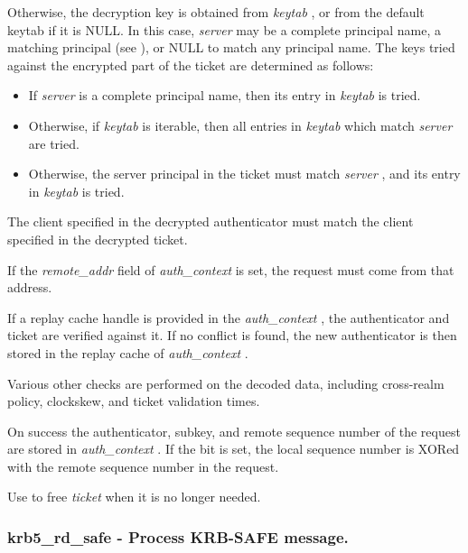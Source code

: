 \documentclass[letterpaper,10pt,english]{sphinxmanual}
\begin{document}
Otherwise, the decryption key is obtained from \emph{keytab} , or from the default keytab if it is NULL. In this case, \emph{server} may be a complete principal name, a matching principal (see {\hyperref[appdev/refs/api/krb5_sname_match:krb5_sname_match]{}} ), or NULL to match any principal name. The keys tried against the encrypted part of the ticket are determined as follows:
\begin{itemize}
\item {} 
If \emph{server} is a complete principal name, then its entry in \emph{keytab} is tried.

\item {} 
Otherwise, if \emph{keytab} is iterable, then all entries in \emph{keytab} which match \emph{server} are tried.

\item {} 
Otherwise, the server principal in the ticket must match \emph{server} , and its entry in \emph{keytab} is tried.

\end{itemize}

The client specified in the decrypted authenticator must match the client specified in the decrypted ticket.

If the \emph{remote\_addr} field of \emph{auth\_context} is set, the request must come from that address.

If a replay cache handle is provided in the \emph{auth\_context} , the authenticator and ticket are verified against it. If no conflict is found, the new authenticator is then stored in the replay cache of \emph{auth\_context} .

Various other checks are performed on the decoded data, including cross-realm policy, clockskew, and ticket validation times.

On success the authenticator, subkey, and remote sequence number of the request are stored in \emph{auth\_context} . If the {\hyperref[appdev/refs/macros/AP_OPTS_MUTUAL_REQUIRED:AP_OPTS_MUTUAL_REQUIRED]{}} bit is set, the local sequence number is XORed with the remote sequence number in the request.

Use {\hyperref[appdev/refs/api/krb5_free_ticket:krb5_free_ticket]{}} to free \emph{ticket} when it is no longer needed.


\subsubsection{krb5\_rd\_safe -  Process KRB-SAFE message.}
\label{appdev/refs/api/krb5_rd_safe:krb5-rd-safe-process-krb-safe-message}\label{appdev/refs/api/krb5_rd_safe::doc}
\end{document}

